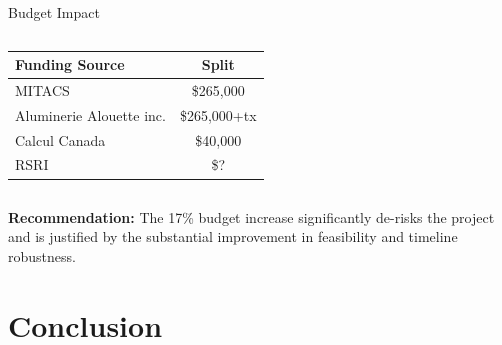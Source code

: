 \documentclass[aspectratio=169]{beamer}
\begin{document}
\begin{frame}{Budget Impact}
\begin{columns}[T]
\scriptsize
\begin{tabular}{|l|c|}
\hline
\rowcolor{accent1!20}
\textbf{Funding Source} & \textbf{Split} \\
\hline
MITACS & \$265,000 \\
\hline
Aluminerie Alouette inc. & \$265,000+tx \\
\hline
Calcul Canada & \$40,000 \\
\hline
RSRI & \$? \\
\hline
\end{tabular}

\end{columns}


\begin{center}
\small
\textcolor{accent1}{\textbf{Recommendation:}} The 17\% budget increase significantly de-risks the project and is justified by the substantial improvement in feasibility and timeline robustness.
\end{center}

\end{frame}

\section{Conclusion}
\end{document}
